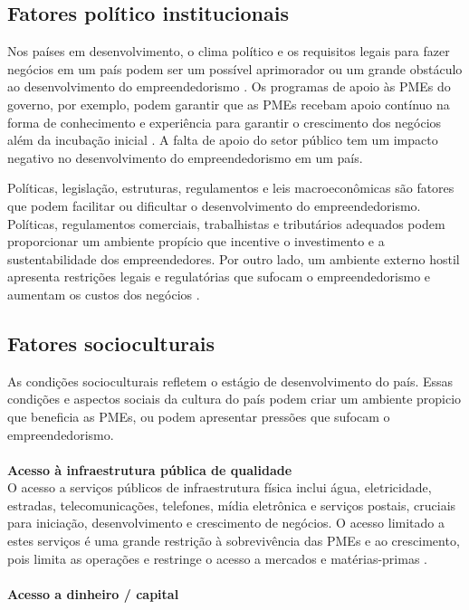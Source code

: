 \subsection{Fatores político institucionais}
\label{subsec:framing}

Nos países em desenvolvimento, o clima político e os requisitos legais para fazer negócios em um país podem ser um possível aprimorador ou um grande obstáculo ao desenvolvimento do empreendedorismo \cite{thandekaruthkunene2008}. Os programas de apoio às PMEs do governo, por exemplo, podem garantir que as PMEs recebam apoio contínuo na forma de conhecimento e experiência para garantir o crescimento dos negócios além da incubação inicial \cite{ligthelma.a.&cantm.c2002}. A falta de apoio do setor público tem um impacto negativo no desenvolvimento do empreendedorismo em um país.

Políticas, legislação, estruturas, regulamentos e leis macroeconômicas são fatores que podem facilitar ou dificultar o desenvolvimento do empreendedorismo. Políticas, regulamentos comerciais, trabalhistas e tributários adequados podem proporcionar um ambiente propício que incentive o investimento e a sustentabilidade dos empreendedores. Por outro lado, um ambiente externo hostil apresenta restrições legais e regulatórias que sufocam o empreendedorismo e aumentam os custos dos negócios \cite{ligthelma.a.&cantm.c2002}.

\subsection{Fatores socioculturais}
\label{subsec:framing}

As condições socioculturais refletem o estágio de desenvolvimento do país. Essas condições e aspectos sociais da cultura do país podem criar um ambiente propicio que beneficia as PMEs, ou podem apresentar pressões que sufocam o empreendedorismo.
\\
\\
\textbf{Acesso à infraestrutura pública de qualidade}
\\

O acesso a serviços públicos de infraestrutura física inclui água, eletricidade, estradas, telecomunicações, telefones, mídia eletrônica e serviços postais, cruciais para iniciação, desenvolvimento e crescimento de negócios. O acesso limitado a estes serviços é uma grande restrição à sobrevivência das PMEs e ao crescimento, pois limita as operações e restringe o acesso a mercados e matérias-primas \cite{thandekaruthkunene2008}.
\\
\\
\textbf{Acesso a dinheiro / capital}
\\

